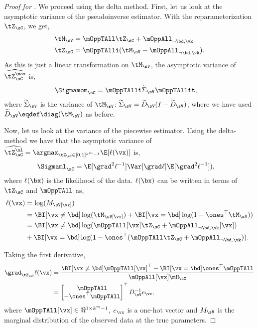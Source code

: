 \begin{proof}[Proof for ]
  We proceed using the delta method. First, let us look at the
  asymptotic variance of the pseudoinverse estimator. With the
  reparameterization $\tZ_\sC$, we get,
  \begin{align*}
    \tM_\sV &= \mOppTAll \tZ_\sC + \mOppAll_{\neg \bd, \vk} \\
    \tZ_\sC &= \mOppTAlli (\tM_\sV - \mOppAll_{\neg \bd, \vk}).
  \end{align*}
  As this is just a linear transformation on $\tM_\sV$, 
  the asymptotic variance of $\widehat{\tZ^\mom_\sC}$ is,
  \begin{align*}
      \Sigmamom_{\sC} &= \mOppTAlli \widetilde\Sigma_\sV \mOppTAllit,
  \end{align*}
  where $\widetilde\Sigma_\sV$ is the variance of $\tM_\sV$: $\widetilde\Sigma_\sV = \widetilde{D}_\sV
  (I - \widetilde{D}_\sV)$, where we have used $\widetilde D_\sV \eqdef \diag(\tM_\sV)$ as
  before.

  Now, let us look at the variance of the piecewise estimator.  Using
  the delta-method \cite{vaart98asymptotic} we have that the asymptotic
  variance of 
  $\widehat{\tZ^\ml_\sC} = \argmax_{\tZ_\sC \in [0,1]^{k^m-1}} \E[\ell(\vx)]$ is,
  \begin{align*}
    \Sigmaml_\sC &= \E[\grad^2 \ell^{-1}] \Var[\grad \ell] \E[\grad^2 \ell^{-1}]),
  \end{align*}
  where $\ell(\bx)$ is the likelihood of the data. $\ell(\bx)$ can be
  written in terms of $\tZ_\sC$ and $\mOppTAll$ as,
  \begin{align*}
    \ell(\vx) 
              &= \log(M_\sV[\vx]) \\
              &= \BI[\vx \neq \bd] \log(\tM_\sV[\vx]) + \BI[\vx = \bd] \log(1 - \ones^\top \tM_\sV) ) \\
              &= \BI[\vx \neq \bd] \log(\mOppTAll[\vx] \tZ_\sC + \mOppAll_{\neg \bd, \vk}[\vx]) \\
              &+ \BI[\vx = \bd] \log(1 - \ones^\top (\mOppTAll \tZ_\sC + \mOppAll_{\neg \bd, \vk})).
  \end{align*}

Taking the first derivative,
\begin{align}
  \grad_{\tZ_\sC} \ell(\vx)
  &= 
  \frac{\BI[\vx \neq \bd] \mOppTAll[\vx]^\top - \BI[\vx = \bd] \ones^\top \mOppTAll}{\mOppAll[\vx] \mH_\sC} 
  \nonumber \\ 
  &= 
  \begin{bmatrix}
    \mOppTAll \\
    -\ones^\top \mOppTAll
  \end{bmatrix}^\top
  D_{\sV}^{-1} e_\vx, \label{eqn:lhood-grad}
\end{align}
where $\mOppTAll[\vx] \in \Re^{1\times k^m-1}$, $e_\vx$ is a one-hot
vector and $M_\sV$ is the marginal distribution of the observed data at
the true parameters.


\end{proof}
